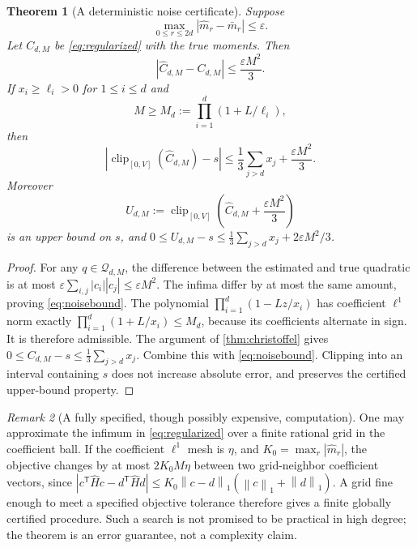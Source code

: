 \documentclass[11pt,letterpaper]{article}
\numberwithin{equation}{section}
\newtheorem{theorem}{Theorem}[section]
\theoremstyle{definition}
\theoremstyle{remark}
\newtheorem{remark}[theorem]{Remark}
\newcommand{\norm}[1]{\left\lVert#1\right\rVert}
\newcommand{\clip}{\operatorname{clip}_{[0,V]}}
\begin{document}
\begin{theorem}[A deterministic noise certificate]
\label{thm:regularized}
Suppose
\begin{equation}
 \max_{0\le r\le2d}|\widehat m_r-\bar m_r|\le\varepsilon.
 \label{eq:momenterror}
\end{equation}
Let $C_{d,M}$ be \eqref{eq:regularized} with the true moments.
Then
\begin{equation}
 |\widehat C_{d,M}-C_{d,M}|\le\frac{\varepsilon M^2}{3}.
 \label{eq:noisebound}
\end{equation}
If $x_i\ge\ell_i>0$ for $1\le i\le d$ and
\begin{equation}
 M\ge M_d:=\prod_{i=1}^d(1+L/\ell_i),
 \label{eq:Md}
\end{equation}
then
\begin{equation}
 |\clip(\widehat C_{d,M})-s|
 \le\frac13\sum_{j>d}x_j+\frac{\varepsilon M^2}{3}.
 \label{eq:regularizedrisk}
\end{equation}
Moreover
\begin{equation}
 U_{d,M}:=\clip\left(\widehat C_{d,M}+\frac{\varepsilon M^2}{3}\right)
 \label{eq:uppercertificate}
\end{equation}
is an upper bound on $s$, and
$0\le U_{d,M}-s\le\frac13\sum_{j>d}x_j+2\varepsilon M^2/3$.
\end{theorem}
\begin{proof}
For any $q\in\mathcal Q_{d,M}$, the difference between the estimated and true
quadratic is at most
$\varepsilon\sum_{i,j}|c_i||c_j|\le\varepsilon M^2$.
The infima differ by at most the same amount, proving \eqref{eq:noisebound}.
The polynomial $\prod_{i=1}^d(1-Lz/x_i)$ has coefficient $\ell^1$ norm
exactly $\prod_{i=1}^d(1+L/x_i)\le M_d$, because its coefficients alternate
in sign. It is therefore admissible. The argument of
\cref{thm:christoffel} gives
$0\le C_{d,M}-s\le\frac13\sum_{j>d}x_j$.
Combine this with \eqref{eq:noisebound}. Clipping into an interval containing
$s$ does not increase absolute error, and preserves the certified upper-bound
property.
\end{proof}

\begin{remark}[A fully specified, though possibly expensive, computation]
One may approximate the infimum in \eqref{eq:regularized} over a finite
rational grid in the coefficient ball. If the coefficient $\ell^1$ mesh is
$\eta$, and $K_0=\max_r|\widehat m_r|$, the objective changes by at most
$2K_0M\eta$ between two grid-neighbor coefficient vectors, since
$|c^{\mathsf T}\widehat Hc-d^{\mathsf T}\widehat Hd|
\le K_0\norm{c-d}_1(\norm c_1+\norm d_1)$.
A grid fine enough to meet a specified objective tolerance therefore gives
a finite globally certified procedure. Such a search is not promised to be
practical in high degree; the theorem is an error guarantee, not a complexity
claim.
\end{remark}
\end{document}
